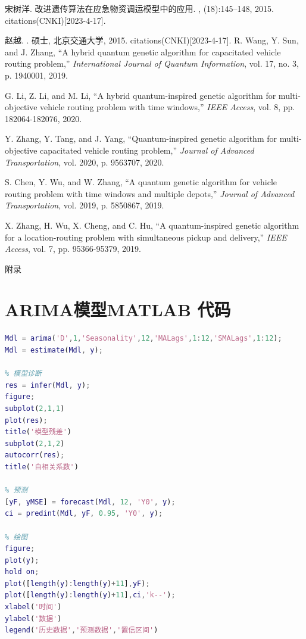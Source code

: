\documentclass{MathorCupmodeling}
\begin{document}
	\begin{thebibliography}{99}
 宋树洋.
\newblock 改进遗传算法在应急物资调运模型中的应用.
, (18):145--148, 2015.
 citations(CNKI)[2023-4-17].

赵越.
.
\newblock 硕士, 北京交通大学, 2015.
 citations(CNKI)[2023-4-17].
	 R. Wang, Y. Sun, and J. Zhang, “A hybrid quantum genetic algorithm for capacitated vehicle routing problem,” \emph{International Journal of Quantum Information}, vol. 17, no. 3, p. 1940001, 2019.

 G. Li, Z. Li, and M. Li, “A hybrid quantum-inspired genetic algorithm for multi-objective vehicle routing problem with time windows,” \emph{IEEE Access}, vol. 8, pp. 182064-182076, 2020.

 Y. Zhang, Y. Tang, and J. Yang, “Quantum-inspired genetic algorithm for multi-objective capacitated vehicle routing problem,” \emph{Journal of Advanced Transportation}, vol. 2020, p. 9563707, 2020.

 S. Chen, Y. Wu, and W. Zhang, “A quantum genetic algorithm for vehicle routing problem with time windows and multiple depots,” \emph{Journal of Advanced Transportation}, vol. 2019, p. 5850867, 2019.

 X. Zhang, H. Wu, X. Cheng, and C. Hu, “A quantum-inspired genetic algorithm for a location-routing problem with simultaneous pickup and delivery,” \emph{IEEE Access}, vol. 7, pp. 95366-95379, 2019.
	\end{thebibliography}

	\newpage
	\appendix

	\begin{center}
		\heiti{} 附\hspace{1pc}录
	\end{center}
\section{ARIMA模型MATLAB 代码}
\begin{lstlisting}[language=Matlab]
% 自动选择 ARIMA 模型
Mdl = arima('D',1,'Seasonality',12,'MALags',1:12,'SMALags',1:12);
Mdl = estimate(Mdl, y);

% 模型诊断
res = infer(Mdl, y);
figure;
subplot(2,1,1)
plot(res);
title('模型残差')
subplot(2,1,2)
autocorr(res);
title('自相关系数')

% 预测
[yF, yMSE] = forecast(Mdl, 12, 'Y0', y);
ci = predint(Mdl, yF, 0.95, 'Y0', y);

% 绘图
figure;
plot(y);
hold on;
plot([length(y):length(y)+11],yF);
plot([length(y):length(y)+11],ci,'k--');
xlabel('时间')
ylabel('数据')
legend('历史数据','预测数据','置信区间')

\end{lstlisting}
\end{document}
